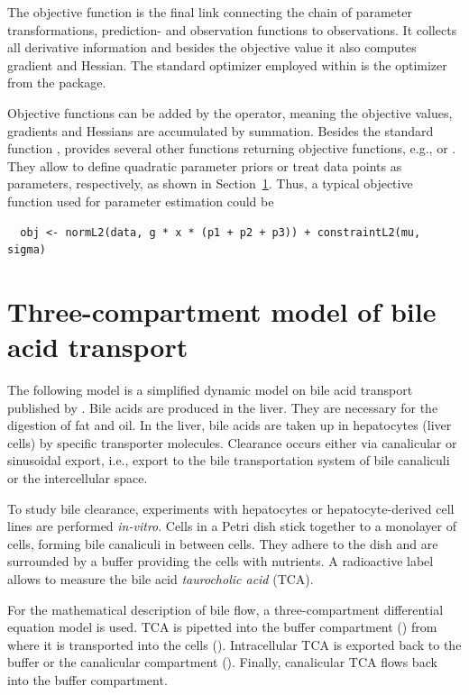 \documentclass[article]{jss}
\begin{document}
The objective function is the final link connecting the chain of parameter transformations, prediction- and observation functions to observations. It collects all derivative information and besides the objective value it also computes gradient and Hessian. The standard optimizer employed within  is the  optimizer from the  package.

Objective functions can be added by the  operator, meaning the objective values, gradients and Hessians are accumulated by summation. Besides the standard function ,  provides several other functions returning objective functions, e.g.,  or . They allow to define quadratic parameter priors or treat data points as parameters, respectively, as shown in Section~\ref{sec:example}. Thus, a typical objective function used for parameter estimation could be
\begin{verbatim}
  obj <- normL2(data, g * x * (p1 + p2 + p3)) + constraintL2(mu, sigma)
\end{verbatim}


\section{Three-compartment model of bile acid transport}
\label{sec:example}

The following model is a simplified dynamic model on bile acid transport published by \cite{kaschek2017dynamic}. Bile acids are produced in the liver. They are necessary for the digestion of fat and oil. In the liver, bile acids are taken up in hepatocytes (liver cells) by specific transporter molecules. Clearance occurs either via canalicular or sinusoidal export, i.e., export to the bile transportation system of bile canaliculi or the intercellular space.

To study bile clearance, experiments with hepatocytes or hepatocyte-derived cell lines are performed \textit{in-vitro}. Cells in a Petri dish stick together to a monolayer of cells, forming bile canaliculi in between cells. They adhere to the dish and are surrounded by a buffer providing the cells with nutrients. A radioactive label allows to measure the bile acid \textit{taurocholic acid} (TCA).

For the mathematical description of bile flow, a three-compartment differential equation model is used. TCA is pipetted into the buffer compartment () from where it is transported into the cells (). Intracellular TCA is exported back to the buffer or the canalicular compartment (). Finally, canalicular TCA flows back into the buffer compartment. 
\end{document}
